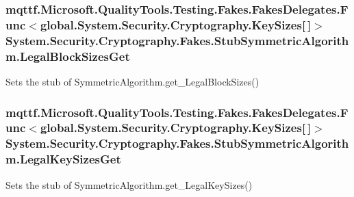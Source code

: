 \hypertarget{class_system_1_1_security_1_1_cryptography_1_1_fakes_1_1_stub_symmetric_algorithm_aacf92e3f05cf57a0b6f2b8c5fd2157d3}{
\subsubsection[{Legal\-Block\-Sizes\-Get}]{\setlength{\rightskip}{0pt plus 5cm}mqttf.\-Microsoft.\-Quality\-Tools.\-Testing.\-Fakes.\-Fakes\-Delegates.\-Func$<$global.\-System.\-Security.\-Cryptography.\-Key\-Sizes\mbox{[}$\,$\mbox{]}$>$ System.\-Security.\-Cryptography.\-Fakes.\-Stub\-Symmetric\-Algorithm.\-Legal\-Block\-Sizes\-Get}}\label{class_system_1_1_security_1_1_cryptography_1_1_fakes_1_1_stub_symmetric_algorithm_aacf92e3f05cf57a0b6f2b8c5fd2157d3}


Sets the stub of Symmetric\-Algorithm.\-get\-\_\-\-Legal\-Block\-Sizes()

\hypertarget{class_system_1_1_security_1_1_cryptography_1_1_fakes_1_1_stub_symmetric_algorithm_a053f486845c6fdfe8b0af12d3e432dbd}{
\subsubsection[{Legal\-Key\-Sizes\-Get}]{\setlength{\rightskip}{0pt plus 5cm}mqttf.\-Microsoft.\-Quality\-Tools.\-Testing.\-Fakes.\-Fakes\-Delegates.\-Func$<$global.\-System.\-Security.\-Cryptography.\-Key\-Sizes\mbox{[}$\,$\mbox{]}$>$ System.\-Security.\-Cryptography.\-Fakes.\-Stub\-Symmetric\-Algorithm.\-Legal\-Key\-Sizes\-Get}}\label{class_system_1_1_security_1_1_cryptography_1_1_fakes_1_1_stub_symmetric_algorithm_a053f486845c6fdfe8b0af12d3e432dbd}


Sets the stub of Symmetric\-Algorithm.\-get\-\_\-\-Legal\-Key\-Sizes()

